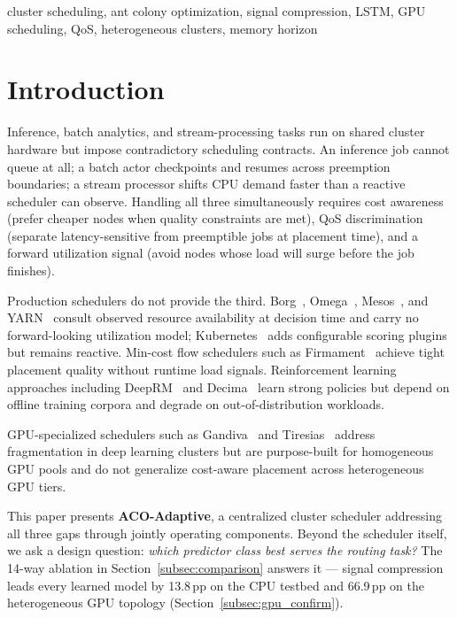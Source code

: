 \documentclass[conference]{IEEEtran}
\begin{document}
\begin{IEEEkeywords}
cluster scheduling, ant colony optimization, signal compression, LSTM,
GPU scheduling, QoS, heterogeneous clusters, memory horizon
\end{IEEEkeywords}


\section{Introduction}

Inference, batch analytics, and stream-processing tasks run on shared
cluster hardware but impose contradictory scheduling contracts. An
inference job cannot queue at all; a batch actor checkpoints and resumes
across preemption boundaries; a stream processor shifts CPU demand faster
than a reactive scheduler can observe. Handling all three simultaneously
requires cost awareness (prefer cheaper nodes when quality constraints are
met), QoS discrimination (separate latency-sensitive from preemptible jobs
at placement time), and a forward utilization signal (avoid nodes whose
load will surge before the job finishes).

Production schedulers do not provide the third. Borg~\cite{verma2015borg},
Omega~\cite{schwarzkopf2013omega}, Mesos~\cite{hindman2011mesos}, and
YARN~\cite{vavilapalli2013yarn} consult observed resource availability at
decision time and carry no forward-looking utilization model;
Kubernetes~\cite{burns2016borg} adds configurable scoring plugins but
remains reactive. Min-cost flow schedulers such as
Firmament~\cite{gog2016firmament} achieve tight placement quality without
runtime load signals. Reinforcement learning approaches including
DeepRM~\cite{mao2016deeprm} and Decima~\cite{mao2019decima} learn strong
policies but depend on offline training corpora and degrade on
out-of-distribution workloads.

GPU-specialized schedulers such as Gandiva~\cite{xiao2018gandiva} and
Tiresias~\cite{gu2019tiresias} address fragmentation in deep learning
clusters but are purpose-built for homogeneous GPU pools and do not
generalize cost-aware placement across heterogeneous GPU tiers.

This paper presents \textbf{ACO-Adaptive}, a centralized cluster scheduler
addressing all three gaps through jointly operating components. Beyond the
scheduler itself, we ask a design question: \emph{which predictor class
best serves the routing task?} The 14-way ablation in
Section~\ref{subsec:comparison} answers it --- signal compression leads
every learned model by 13.8\,pp on the CPU testbed and 66.9\,pp on the
heterogeneous GPU topology (Section~\ref{subsec:gpu_confirm}).
\end{document}
